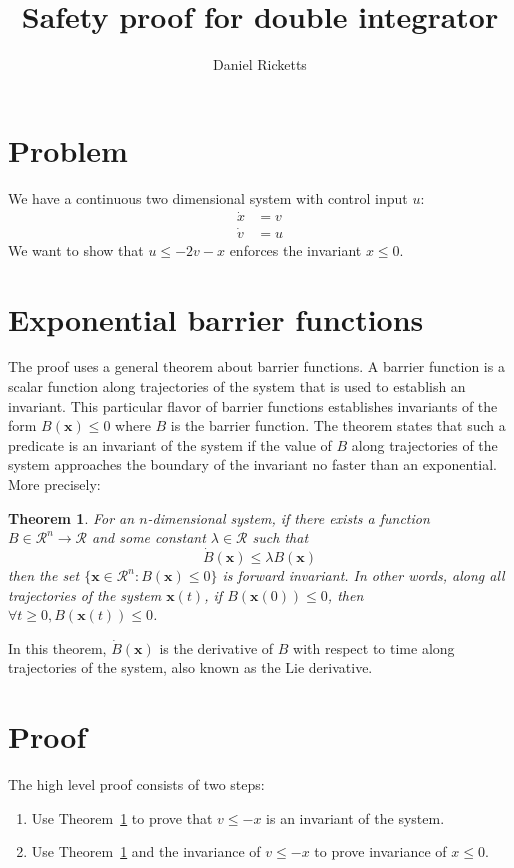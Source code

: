 \documentclass[12pt]{article}
\title{Safety proof for double integrator}
\author{Daniel Ricketts}
\newtheorem{theorem}{Theorem}
\newcommand{\vecbold}[1]{\boldsymbol{#1}}
\begin{document}
\maketitle

\section{Problem}
We have a continuous two dimensional system with control input $u$:
\begin{align}
\dot{x} &= v \\
\dot{v} &= u
\end{align}
We want to show that $u \leq -2v-x$ enforces the invariant $x \leq 0$.

\section{Exponential barrier functions}
The proof uses a general theorem about barrier functions. A barrier
function is a scalar function along trajectories of the system that is used
to establish an invariant. This particular flavor of barrier functions
establishes invariants of the form $B(\vecbold{x}) \leq 0$ where $B$ is the
barrier function. The theorem states that such a predicate is an invariant
of the system if the value of $B$ along trajectories of the system
approaches the boundary of the invariant no faster than an
exponential. More precisely:

\begin{theorem}
For an $n$-dimensional system, if there exists a function $B \in \mathcal{R}^n \rightarrow \mathcal{R}$ and some constant $\lambda \in \mathcal{R}$ such that
\[\dot{B}(\vecbold{x}) \leq \lambda B(\vecbold{x})\]
then the set $\{\vecbold{x} \in \mathcal{R}^n : B(\vecbold{x}) \leq 0\}$ is forward invariant. In other words, along all trajectories of the system $\vecbold{x}(t)$, if $B(\vecbold{x}(0)) \leq 0$, then $\forall t \geq 0, B(\vecbold{x}(t)) \leq 0$.
\label{thm:exp-barrier}
\end{theorem}

In this theorem, $\dot{B}(\vecbold{x})$ is the derivative of $B$ with
respect to time along trajectories of the system, also known as the Lie
derivative.

\section{Proof}
The high level proof consists of two steps:
\begin{enumerate}
\item Use Theorem~\ref{thm:exp-barrier} to prove that $v \leq -x$ is an invariant of the system.
\item Use Theorem~\ref{thm:exp-barrier} and the invariance of $v \leq -x$ to prove invariance of $x \leq 0$.
\end{enumerate}
\end{document}

